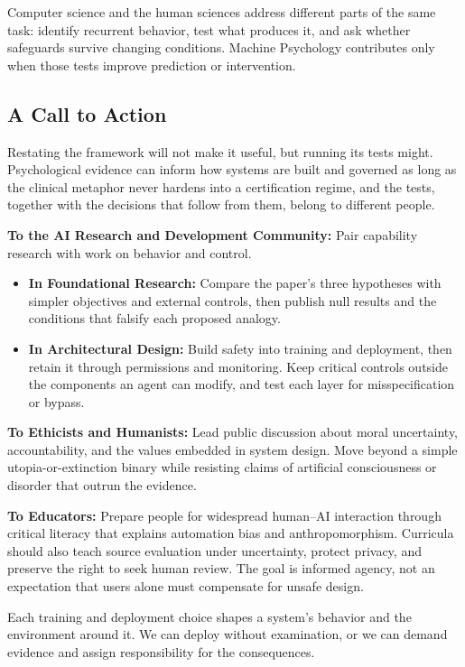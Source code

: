 \documentclass{article}
\begin{document}
Computer science and the human sciences address different parts of the same task: identify recurrent behavior, test what produces it, and ask whether safeguards survive changing conditions. Machine Psychology contributes only when those tests improve prediction or intervention.

\subsection{A Call to Action}
Restating the framework will not make it useful, but running its tests might. Psychological evidence can inform how systems are built and governed as long as the clinical metaphor never hardens into a certification regime, and the tests, together with the decisions that follow from them, belong to different people.

\textbf{To the AI Research and Development Community:} Pair capability research with work on behavior and control.
\begin{itemize}
    \item \textbf{In Foundational Research:} Compare the paper's three hypotheses with simpler objectives and external controls, then publish null results and the conditions that falsify each proposed analogy.
    \item \textbf{In Architectural Design:} Build safety into training and deployment, then retain it through permissions and monitoring. Keep critical controls outside the components an agent can modify, and test each layer for misspecification or bypass.
\end{itemize}

\textbf{To Ethicists and Humanists:} Lead public discussion about moral uncertainty, accountability, and the values embedded in system design. Move beyond a simple utopia-or-extinction binary while resisting claims of artificial consciousness or disorder that outrun the evidence.

\textbf{To Educators:} Prepare people for widespread human--AI interaction through critical literacy that explains automation bias and anthropomorphism. Curricula should also teach source evaluation under uncertainty, protect privacy, and preserve the right to seek human review. The goal is informed agency, not an expectation that users alone must compensate for unsafe design.

Each training and deployment choice shapes a system's behavior and the environment around it. We can deploy without examination, or we can demand evidence and assign responsibility for the consequences.
\end{document}
